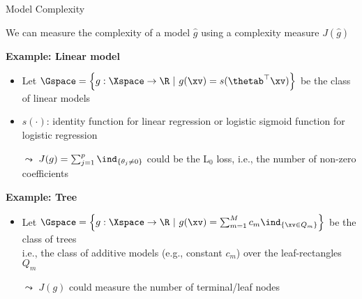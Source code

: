 \documentclass[11pt,compress,t,notes=noshow, aspectratio=169, xcolor=table]{beamer}
\newcommand{\gh}{\hat{g}}
\begin{document}
\begin{frame}{Model Complexity}
    
    We can measure the complexity of a model $\gh$ using a complexity measure $J(\gh)$ \lz

 	\textbf{Example: Linear model}\\
 	\begin{itemize}
 	    \item Let $\Gspace = \left\{g: \Xspace \to \R ~|~g(\xv) = s(\thetab^\top \xv)\right\}$ be the class of linear models
 	    \item $s(\cdot)$: identity function for linear regression or logistic sigmoid function for logistic regression
 	    \item[$\leadsto$] $J(g) = \sum_{j = 1}^p \ind_{\{ \theta_j \neq 0 \}}$ could be the L$_0$ loss, i.e., the number of non-zero coefficients 
 	\end{itemize}
 	\lz\pause
 	
 	\textbf{Example: Tree}\\
 	\begin{itemize}
 	    \item Let $\Gspace = \left\{g:\Xspace \to \R ~|~g(\xv) = \sum_{m=1}^M c_m \ind_{\{ \xv \in Q_m \}}\right\}$ be the class of trees\\
 	     i.e., the class of additive models (e.g., constant $c_m$)  over the leaf-rectangles $Q_m$
 	    \item[$\leadsto$] $J(g)$ could measure the number of terminal/leaf nodes
 	\end{itemize}
 	
\end{frame}
 
\end{document}
